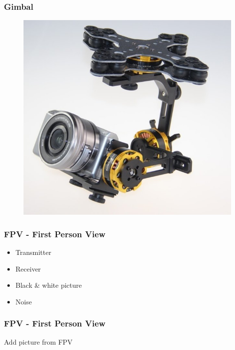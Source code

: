 \begin{frame}
\frametitle{Gimbal}

  \begin{figure}
  \includegraphics[scale=0.4]{pic/03_our-copter/gimbal.jpg}
  \end{figure}
  
\end{frame}



\begin{frame}
\frametitle{FPV - First Person View}

  \begin{itemize}
    \item Transmitter    
    \item Receiver   
	\item Black \& white picture
	\item Noise 
  \end{itemize}
  
\end{frame}


\begin{frame}
\frametitle{FPV - First Person View}

	Add picture from FPV
  
\end{frame}





